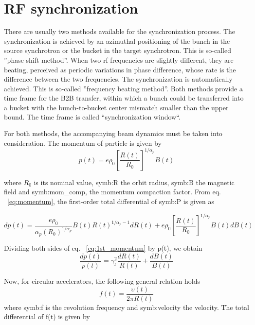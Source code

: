 \section{RF synchronization}
\label{two_sync_methods}

There are usually two methods available for the synchronization process. The synchronization is achieved by an azimuthal positioning of the bunch in the source synchrotron or the bucket in the target synchrotron. This is so-called ''phase shift method''. When two rf frequencies are slightly different, they are beating, perceived as periodic variations in phase difference, whose rate is the difference between the two frequencies. The synchronization is automatically achieved. This is so-called ''frequency beating method''. Both methods provide a time frame for the B2B transfer, within which a bunch could be transferred into a bucket with the bunch-to-bucket center mismatch smaller than the upper bound. The time frame is called ``synchronization window``. 

For both methods, the accompanying beam dynamics must be taken into consideration. The momentum of particle is given by 
\begin{equation}
\label{eq:momentum}
p(t)=e\rho_0 [\frac {R(t)}{R_0}]^{1/\alpha_p }B(t) 
\end{equation}

where $R_0$ is its nominal value, \gls{symb:R} the orbit radius, \gls{symb:B} the magnetic field and \gls{symb:mom_comp}, the momentum compaction factor. From eq. ~\ref{eq:momentum}, the first-order total differential of \gls{symb:P} is given as

\begin{equation}
\label{eq:1st_momentum}
dp(t)=\frac{e\rho_0}{\alpha_p (R_0)^{1/\alpha_p}}B(t)R(t)^{1/\alpha_p-1}dR(t)+ e\rho_0 [\frac {R(t)}{R_0}]^{1/\alpha_p }B(t)dB(t) 
\end{equation}

Dividing both sides of eq. ~\ref{eq:1st_momentum} by p(t), we obtain
\begin{equation}
\label{eq:pRB}
\frac{dp(t)}{p(t)}={\gamma_t^2}\frac{dR(t)}{R(t)}+\frac{dB(t)}{B(t)} 
\end{equation}

Now, for circular accelerators, the following general relation holds
\begin{equation}
\label{eq:frequency}
f(t)=\frac{\upsilon(t)}{2\pi R(t)} 
\end{equation}
where \gls{symb:f} is the revolution frequency and \gls{symb:velocity} the velocity. The total differential of f(t) is given by

